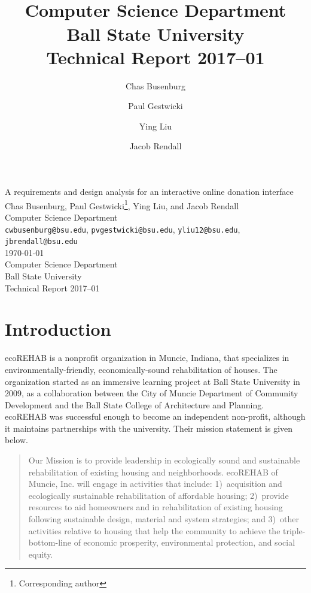 \documentclass[letter]{article}
\title{\\
  Computer Science Department\\
  Ball State University\\
  Technical Report 2017--01}
\author{
  Chas Busenburg
  \and
  Paul Gestwicki
  \and
  Ying Liu
  \and
  Jacob Rendall}
\begin{document}
\begin{centering}
{\Large A requirements and design analysis for an interactive online donation interface}\\
\vspace{0.5cm}
Chas Busenburg, Paul Gestwicki\footnote{Corresponding author}, Ying Liu, and Jacob Rendall\\
Computer Science Department\\
\texttt{cwbusenburg@bsu.edu}, 
\texttt{pvgestwicki@bsu.edu},
\texttt{yliu12@bsu.edu},
\texttt{jbrendall@bsu.edu}\\
\vspace{0.5cm}
\today\\
\vspace{0.5cm}
Computer Science Department\\
Ball State University\\
Technical Report 2017--01\\
\end{centering}

\section*{Introduction}


ecoREHAB is a nonprofit organization in Muncie, Indiana, that specializes
in environmentally-friendly, economically-sound rehabilitation of houses.
The organization started as an immersive learning project at Ball
State University in 2009, as a collaboration between the 
City of Muncie Department of Community Development and the 
Ball State College of Architecture and Planning.
ecoREHAB was successful enough to become an independent non-profit, 
although it maintains partnerships with the university.
Their mission statement is given below.

\begin{quote}
  Our Mission is to provide leadership in ecologically sound and
  sustainable rehabilitation of existing housing and
  neighborhoods. ecoREHAB of Muncie, Inc. will engage in activities
  that include: 1)~acquisition and ecologically sustainable
  rehabilitation of affordable housing; 2)~provide resources to aid
  homeowners and in rehabilitation of existing housing following
  sustainable design, material and system strategies; and 3)~other
  activities relative to housing that help the community to achieve
  the triple-bottom-line of economic prosperity, environmental
  protection, and social equity.
\end{quote}
\end{document}
